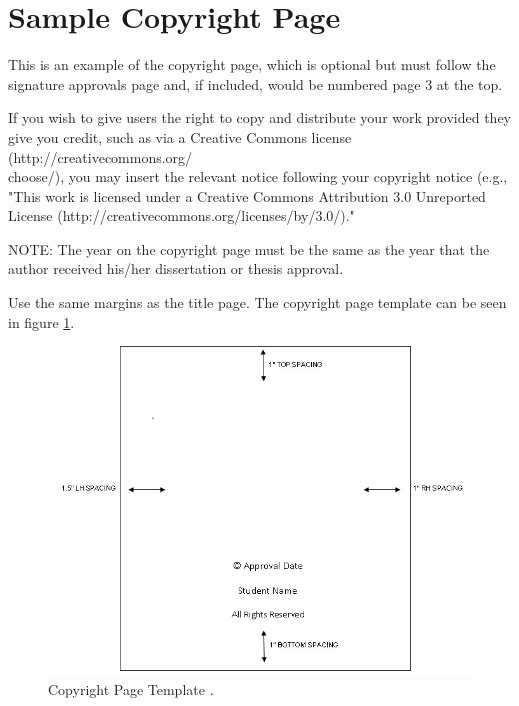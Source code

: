 \section{Sample Copyright Page}

This is an example of the copyright page, which is optional but must follow the signature approvals page and, if included, would be numbered page 3 at the top.  

If you wish to give users the right to copy and distribute your work provided they give you credit, such as via a Creative Commons license (http://creativecommons.org/\\choose/), you may insert the relevant notice following your copyright notice (e.g., "This work is licensed under a Creative Commons Attribution 3.0 Unreported License (http://creativecommons.org/licenses/by/3.0/)."

NOTE: The year on the copyright page must be the same as the year that the author received his/her dissertation or thesis approval.

Use the same margins as the title page. The copyright page template can be seen in figure \ref{copyright_page}.

\begin{figure}[H]
\begin{center}
\includegraphics[scale=0.85]{Figures/Copyright_Page.jpg}
\caption{Copyright Page Template \cite{guidelines}.}
\label{copyright_page}
\end{center}
\end{figure}

